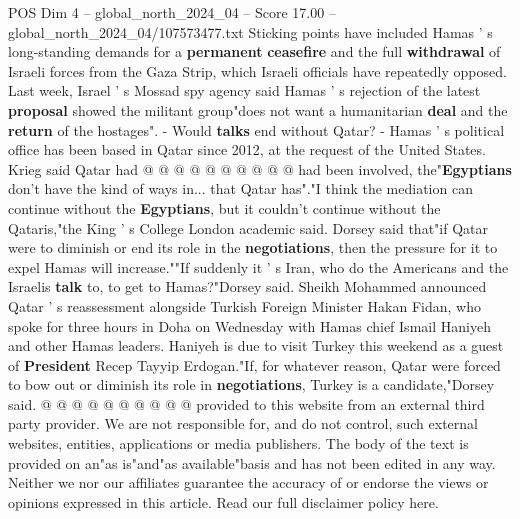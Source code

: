\begin{textsample}{POS Dim 4 – global\_north\_2024\_04 – Score 17.00 – global\_north\_2024\_04/107573477.txt}
Sticking points have included Hamas ' s long-standing demands for a \textbf{permanent} \textbf{ceasefire} and the full \textbf{withdrawal} of Israeli forces from the Gaza Strip, which Israeli officials have repeatedly opposed.
Last week, Israel ' s Mossad spy agency said Hamas ' s rejection of the latest \textbf{proposal} showed the militant group"does not want a humanitarian \textbf{deal} and the \textbf{return} of the hostages". - Would \textbf{talks} end without Qatar? - Hamas ' s political office has been based in Qatar since 2012, at the request of the United States.
Krieg said Qatar had @ @ @ @ @ @ @ @ @ @ had been involved, the"\textbf{Egyptians} don't have the kind of ways in... that Qatar has"."I think the mediation can continue without the \textbf{Egyptians}, but it couldn't continue without the Qataris,"the King ' s College London academic said.
Dorsey said that"if Qatar were to diminish or end its role in the \textbf{negotiations}, then the pressure for it to expel Hamas will increase.""If suddenly it ' s Iran, who do the Americans and the Israelis \textbf{talk} to, to get to Hamas?"Dorsey said.
Sheikh Mohammed announced Qatar ' s reassessment alongside Turkish Foreign Minister Hakan Fidan, who spoke for three hours in Doha on Wednesday with Hamas chief Ismail Haniyeh and other Hamas leaders.
Haniyeh is due to visit Turkey this weekend as a guest of \textbf{President} Recep Tayyip Erdogan."If, for whatever reason, Qatar were forced to bow out or diminish its role in \textbf{negotiations}, Turkey is a candidate,"Dorsey said. @ @ @ @ @ @ @ @ @ @ provided to this website from an external third party provider.
We are not responsible for, and do not control, such external websites, entities, applications or media publishers.
The body of the text is provided on an"as is"and"as available"basis and has not been edited in any way.
Neither we nor our affiliates guarantee the accuracy of or endorse the views or opinions expressed in this article.
Read our full disclaimer policy here.

\end{textsample}
